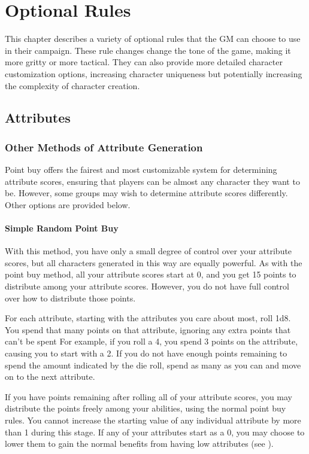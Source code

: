 \chapter{Optional Rules}

This chapter describes a variety of optional rules that the GM can choose to use in their campaign.
These rule changes change the tone of the game, making it more gritty or more tactical.
They can also provide more detailed character customization options, increasing character uniqueness but potentially increasing the complexity of character creation.

\section{Attributes}

  \subsection{Other Methods of Attribute Generation}
    Point buy offers the fairest and most customizable system for determining attribute scores, ensuring that players can be almost any character they want to be. However, some groups may wish to determine attribute scores differently. Other options are provided below.

    \subsubsection{Simple Random Point Buy}
      With this method, you have only a small degree of control over your attribute scores, but all characters generated in this way are equally powerful.
      As with the point buy method, all your attribute scores start at 0, and you get 15 points to distribute among your attribute scores.
      However, you do not have full control over how to distribute those points.

      For each attribute, starting with the attributes you care about most, roll 1d8.
      You spend that many points on that attribute, ignoring any extra points that can't be spent
      For example, if you roll a 4, you spend 3 points on the attribute, causing you to start with a 2.
      If you do not have enough points remaining to spend the amount indicated by the die roll, spend as many as you can and move on to the next attribute.

      If you have points remaining after rolling all of your attribute scores, you may distribute the points freely among your abilities, using the normal point buy rules.
      You cannot increase the starting value of any individual attribute by more than 1 during this stage.
      If any of your attributes start as a 0, you may choose to lower them to gain the normal benefits from having low attributes (see ).

